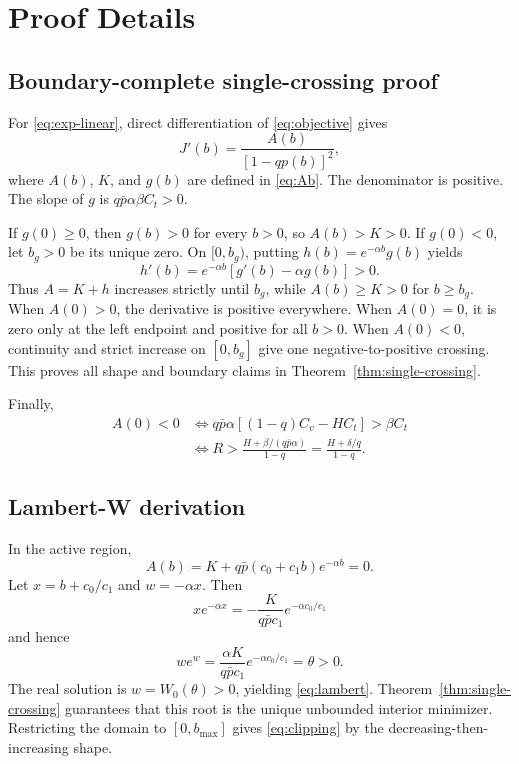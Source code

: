 \section{Proof Details}
\label{app:proofs}

\subsection{Boundary-complete single-crossing proof}

For \eqref{eq:exp-linear}, direct differentiation of
\eqref{eq:objective} gives
\[
 J'(b)=\frac{A(b)}{[1-qp(b)]^2},
\]
where \(A(b)\), \(K\), and \(g(b)\) are defined in
\eqref{eq:Ab}.  The denominator is positive.  The slope of \(g\) is
\(q\bar p\alpha\beta C_t>0\).

If \(g(0)\geq0\), then \(g(b)>0\) for every \(b>0\), so
\(A(b)>K>0\).  If \(g(0)<0\), let \(b_g>0\) be its unique zero.  On
\([0,b_g)\), putting \(h(b)=e^{-\alpha b}g(b)\) yields
\[
 h'(b)=e^{-\alpha b}[g'(b)-\alpha g(b)]>0.
\]
Thus \(A=K+h\) increases strictly until \(b_g\), while
\(A(b)\geq K>0\) for \(b\geq b_g\).  When \(A(0)>0\), the derivative is
positive everywhere.  When \(A(0)=0\), it is zero only at the left endpoint
and positive for all \(b>0\).  When \(A(0)<0\), continuity and strict
increase on \([0,b_g]\) give one negative-to-positive crossing.  This proves
all shape and boundary claims in Theorem~\ref{thm:single-crossing}.

Finally,
\begin{align*}
 A(0)<0
 &\Longleftrightarrow
 q\bar p\alpha[(1-q)C_v-HC_t]>\beta C_t\\
 &\Longleftrightarrow
 R>\frac{H+\beta/(q\bar p\alpha)}{1-q}
 =\frac{H+\delta/q}{1-q}.
\end{align*}

\subsection{Lambert-W derivation}

In the active region,
\[
 A(b)=K+q\bar p(c_0+c_1b)e^{-\alpha b}=0.
\]
Let \(x=b+c_0/c_1\) and \(w=-\alpha x\).  Then
\[
 x e^{-\alpha x}
 =-\frac{K}{q\bar p c_1}e^{-\alpha c_0/c_1}
\]
and hence
\[
 w e^w=
 \frac{\alpha K}{q\bar p c_1}
 e^{-\alpha c_0/c_1}=\theta>0.
\]
The real solution is \(w=W_0(\theta)>0\), yielding
\eqref{eq:lambert}.  Theorem~\ref{thm:single-crossing} guarantees that this
root is the unique unbounded interior minimizer.  Restricting the domain to
\([0,b_{\max}]\) gives \eqref{eq:clipping} by the decreasing-then-increasing
shape.

